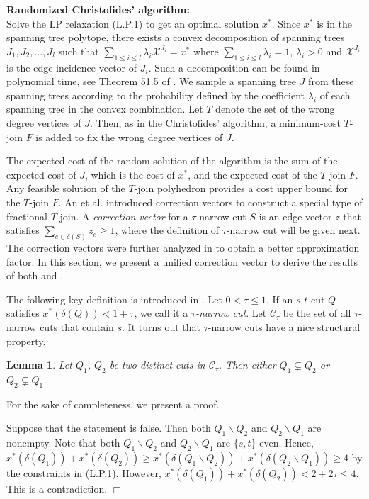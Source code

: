 \documentclass[11pt]{article}
\newcommand{\qed}{\hspace*{\fill}$\Box$}
\newtheorem{lemma}[theorem]{Lemma}
\newenvironment{proof}[1][Proof. ]{\noindent {\bf #1 }}{\qed}
\begin{document}
\noindent \textbf{Randomized Christofides' algorithm:} \\
Solve the LP relaxation (L.P.1) to get an optimal solution $x^*$. Since $x^*$ is in the spanning tree polytope,
there exists a convex decomposition of spanning trees
$J_1, J_2, \ldots, J_l$ such that
$\sum_{1\leq i\leq l}\lambda_i \mathcal{X}^{J_i} = x^*$ where $\sum_{1\leq i\leq l}\lambda_i =1$, $\lambda_i>0$ and $\mathcal{X}^{J_i}$
is the edge incidence vector of $J_i$.
Such a decomposition can be found in polynomial time, see
Theorem 51.5 of \cite{Sch03}. We sample a spanning tree $J$ from these spanning trees according to
the probability defined by the coefficient $\lambda_i$ of
each spanning tree in the convex combination.
Let $T$ denote the set of the wrong degree vertices of $J$.
Then, as in the Christofides' algorithm,
a minimum-cost $T$-join $F$ is added to fix
the wrong degree vertices of $J$.

The expected cost of the random solution of the algorithm
is the sum of the expected cost of $J$, which is the cost of $x^*$,
and the expected cost of the $T$-join $F$.
Any feasible solution of the $T$-join polyhedron provides
a cost upper bound for the $T$-join $F$.
An et al. \cite{AKS12} introduced correction vectors to construct a special type of fractional $T$-join. A \emph{correction vector} for a $\tau$-narrow cut $S$ is an edge vector $z$ that satisfies $\sum_{e\in \delta(S)}z_e\geq 1$, where the definition of $\tau$-narrow cut will be given next. The correction vectors were further analyzed in \cite{sebo13}
to obtain a better approximation factor. In this section, we present a unified correction vector
to derive the results of both \cite{AKS12} and \cite{sebo13}.

The following key definition is introduced in \cite{AKS12}.
Let $0<\tau\leq 1$. If an $s$-$t$ cut $Q$ satisfies
$x^*(\delta(Q))<1+\tau$, we call it a \emph{$\tau$-narrow cut}.
Let $\mathcal{C}_\tau$ be the set of all $\tau$-narrow cuts
that contain $s$. It turns out that $\tau$-narrow cuts have
a nice structural property.

\begin{lemma}\cite{AKS12} \label{lem:nestedCuts}
Let $Q_1$, $Q_2$ be two distinct cuts in $\mathcal{C}_\tau$.
Then either $Q_1\subsetneq Q_2$ or $Q_2\subsetneq Q_1$.
\end{lemma}

For the sake of completeness, we present a proof.
\vspace{3mm}

\begin{proof}
Suppose that the statement is false.
Then both $Q_1\backslash Q_2$ and $Q_2\backslash Q_1$ are nonempty.
Note that both $Q_1\backslash Q_2$ and $Q_2\backslash Q_1$ are
$\{s,t\}$-even. Hence,
$x^*(\delta(Q_1))+x^*(\delta(Q_2))\geq
	x^*(\delta(Q_1\backslash Q_2))+x^*(\delta(Q_2\backslash Q_1))\geq 4$
by the constraints in (L.P.1).
However, $x^*(\delta(Q_1))+x^*(\delta(Q_2))< 2+2\tau \leq 4$.
This is a contradiction.
\end{proof}
\end{document}
